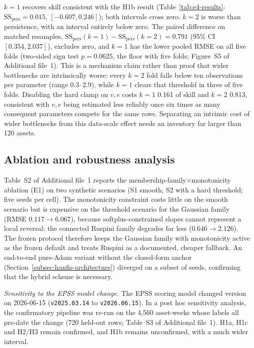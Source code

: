 \documentclass[referee,lineno,pdflatex,sn-basic]{sn-jnl}%
\theoremstyle{thmstyleone}%
\theoremstyle{thmstyletwo}%
\theoremstyle{thmstylethree}%
\begin{document}
$k{=}1$ recovers skill consistent with the H1b result (Table~\ref{tab:e4-results}: $\mathrm{SS}_{\mathrm{pers}}=0.015$, $[-0.607,0.246]$); both intervals cross zero. $k{=}2$ is worse than persistence, with an interval entirely below zero. The paired difference on matched resamples, $\mathrm{SS}_{\mathrm{pers}}(k{=}1)-\mathrm{SS}_{\mathrm{pers}}(k{=}2)=0.791$ (95\% CI $[0.354,2.037]$), excludes zero, and $k{=}1$ has the lower pooled RMSE on all five folds (two-sided sign test $p=0.0625$, the floor with five folds; Figure~S5 of Additional file~1). This is a mechanism claim rather than proof that wider bottlenecks are intrinsically worse: every $k{=}2$ fold falls below ten observations per parameter (range 0.3--2.9), while $k{=}1$ clears that threshold in three of five folds. Disabling the hard clamp on $v,e$ costs $k{=}1$ 0.161 of skill and $k{=}2$ 0.813, consistent with $v,e$ being estimated less reliably once six times as many consequent parameters compete for the same rows. Separating an intrinsic cost of wider bottlenecks from this data-scale effect needs an inventory far larger than 120 assets.

\subsection{Ablation and robustness analysis}\label{subssec4.5}
Table~S2 of Additional file~1 reports the membership-family$\times$monotonicity ablation (E1) on two synthetic scenarios (S1 smooth, S2 with a hard threshold; five seeds per cell). The monotonicity constraint costs little on the smooth scenario but is expensive on the threshold scenario for the Gaussian family (RMSE $0.117\to6.067$), because softplus-constrained slopes cannot represent a local reversal; the connected Ruspini family degrades far less ($0.646\to2.126$). The frozen protocol therefore keeps the Gaussian family with monotonicity active as the frozen default and treats Ruspini as a documented, cheaper fallback. An end-to-end pure-Adam variant without the closed-form anchor (Section~\ref{subsec:hanfis-architecture}) diverged on a subset of seeds, confirming that the hybrid scheme is necessary.

\emph{Sensitivity to the EPSS model change.} The EPSS scoring model changed version on 2026-06-15 (\texttt{v2025.03.14} to \texttt{v2026.06.15}). In a post hoc sensitivity analysis, the confirmatory pipeline was re-run on the 4{,}560 asset-weeks whose labels all pre-date the change (720 held-out rows; Table~S3 of Additional file~1). H1a, H1c and H2/H3 remain confirmed, and H1b remains unconfirmed, with a much wider interval.
\end{document}
